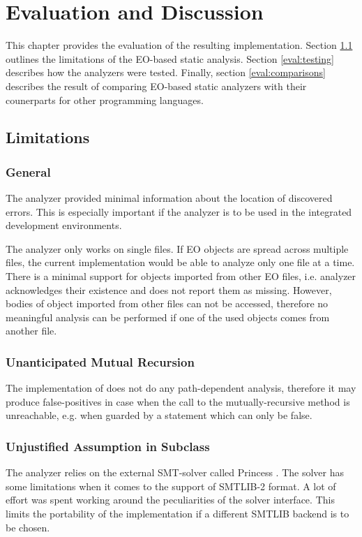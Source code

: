 \chapter{Evaluation and Discussion}
\label{chap:eval}
This chapter provides the evaluation of the resulting implementation. Section \ref{eval:limitations} outlines the limitations of the EO-based static analysis. Section \ref{eval:testing} describes how the analyzers were tested. Finally, section \ref{eval:comparisons} describes the result of comparing EO-based static analyzers with their counerparts for other programming languages.

\section{Limitations}
\label{eval:limitations}

\subsection{General}
The analyzer provided minimal information about the location of discovered errors. This is especially important if the analyzer is to be used in the integrated development environments.

The analyzer only works on single files. If EO objects are spread across multiple files, the current implementation would be able to analyze only one file at a time. There is a minimal support for objects imported from other EO files, i.e. analyzer acknowledges their existence and does not report them as missing. However, bodies of object imported from other files can not be accessed, therefore no meaningful analysis can be performed if one of the used objects comes from another file.

\subsection{Unanticipated Mutual Recursion}
The implementation of does not do any path-dependent analysis, therefore it may produce false-positives in case when the call to the mutually-recursive method is unreachable, e.g. when guarded by a statement which can only be false. 

\subsection{Unjustified Assumption in Subclass}
The analyzer relies on the external SMT-solver called Princess \cite{princess}. The solver has some limitations when it comes to the support of SMTLIB-2 \cite{smtlib} format. A lot of effort was spent working around the peculiarities of the solver interface. This limits the portability of the implementation if a different SMTLIB backend is to be chosen.

